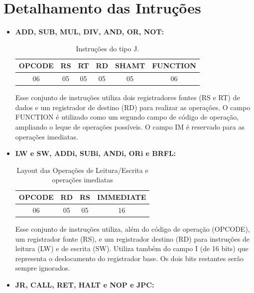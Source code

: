 \documentclass{report}
\begin{document}
  \section{Detalhamento das Intruções}
  
  \begin{itemize}
     
     \item \textbf{ADD, SUB, MUL, DIV, AND, OR, NOT:}

  \begin{table}[H]
\centering
	\begin{tabular}{|c|c|c|c|c|c|}
  	\hline 
  	\textbf{OPCODE} & \textbf{RS} & \textbf{RT} & \textbf{RD} & \textbf{SHAMT} & \textbf{FUNCTION} \\ 
  	\hline 
  	06 & 05 & 05 & 05 & 05 & 06 \\ 
  	\hline 
  	\end{tabular} 
  	\caption{Instruções do tipo J.}
  \end{table}
  
  Esse conjunto de instruções utiliza dois registradores fontes (RS e RT) de dados e um registrador de destino (RD) para realizar as operações. O campo FUNCTION é utilizado como um segundo campo de código de operação, ampliando o leque de operações possíveis. O campo IM é reservado para as operações imediatas.\\
  
   \item \textbf{LW e SW, ADDi, SUBi, ANDi, ORi e BRFL:}

  \begin{table}[H]
\centering
	\begin{tabular}{|c|c|c|c|}
  	\hline 
  	\textbf{OPCODE} & \textbf{RD} & \textbf{RS} & \textbf{IMMEDIATE}  \\ 
  	\hline 
  	06 & 05 & 05 & 16 \\ 
  	\hline 
  	\end{tabular} 
  	\caption{Layout das Operações de Leitura/Escrita e operações imediatas}
  \end{table}
  
  Esse conjunto de instruções utiliza, além do código de operação (OPCODE), um registrador fonte (RS), e um registrador destino (RD) para instruções de leitura (LW) e de escrita (SW). Utiliza também do campo I (de 16 bits) que representa o deslocamento do registrador base. Os dois bits restantes serão sempre ignorados.\\

  
  \item \textbf{JR, CALL, RET, HALT e NOP e JPC:}


\end{itemize}
\end{document}
